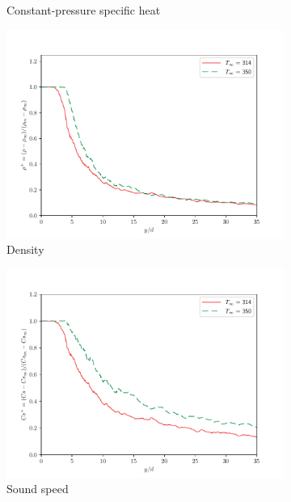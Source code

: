 \begin{figure}[H]
\begin{center}
\begin{subfigure}{0.45\textwidth}
	\caption{Constant-pressure specific heat} \label{noniso_cp_centerline_1}
\end{subfigure}
\vfill
\begin{subfigure}{0.45\textwidth}
	\includegraphics[scale=.45]{figures/Plots/centerline/rho_centerline_scaled.pdf}
	\caption{Density} \label{noniso_rho_centerline_1}
\end{subfigure}
\begin{subfigure}{0.45\textwidth}
	\includegraphics[scale=.45]{figures/Plots/centerline/Cs_centerline_scaled.pdf}
	\caption{Sound speed} \label{noniso_Cs_centerline_1}
\end{subfigure}
\vfill
\begin{subfigure}{0.45\textwidth}

\end{subfigure}
\end{center}
\end{figure}
